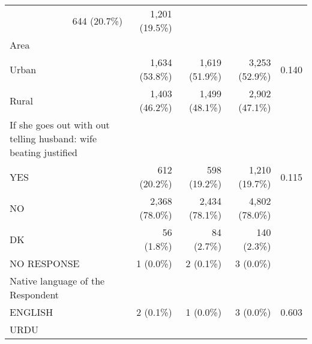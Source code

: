 \documentclass{article}
\begin{document}
\begin{table}[!h]
\begin{tabular}{lllll}
  \multicolumn{1}{r}{644 (20.7\%)} &
  \multicolumn{1}{r}{1,201 (19.5\%)} &
  \multicolumn{1}{r}{} \\
\multicolumn{1}{l}{Area} &
  \multicolumn{1}{r}{} &
  \multicolumn{1}{r}{} &
  \multicolumn{1}{r}{} &
  \multicolumn{1}{r}{} \\
\multicolumn{1}{l}{\hspace{1em}Urban} &
  \multicolumn{1}{r}{1,634 (53.8\%)} &
  \multicolumn{1}{r}{1,619 (51.9\%)} &
  \multicolumn{1}{r}{3,253 (52.9\%)} &
  \multicolumn{1}{r}{0.140} \\
\multicolumn{1}{l}{\hspace{1em}Rural} &
  \multicolumn{1}{r}{1,403 (46.2\%)} &
  \multicolumn{1}{r}{1,499 (48.1\%)} &
  \multicolumn{1}{r}{2,902 (47.1\%)} &
  \multicolumn{1}{r}{} \\
\multicolumn{1}{l}{If she goes out with out telling husband: wife beating justified} &
  \multicolumn{1}{r}{} &
  \multicolumn{1}{r}{} &
  \multicolumn{1}{r}{} &
  \multicolumn{1}{r}{} \\
\multicolumn{1}{l}{\hspace{1em}YES} &
  \multicolumn{1}{r}{612 (20.2\%)} &
  \multicolumn{1}{r}{598 (19.2\%)} &
  \multicolumn{1}{r}{1,210 (19.7\%)} &
  \multicolumn{1}{r}{0.115} \\
\multicolumn{1}{l}{\hspace{1em}NO} &
  \multicolumn{1}{r}{2,368 (78.0\%)} &
  \multicolumn{1}{r}{2,434 (78.1\%)} &
  \multicolumn{1}{r}{4,802 (78.0\%)} &
  \multicolumn{1}{r}{} \\
\multicolumn{1}{l}{\hspace{1em}DK} &
  \multicolumn{1}{r}{56 (1.8\%)} &
  \multicolumn{1}{r}{84 (2.7\%)} &
  \multicolumn{1}{r}{140 (2.3\%)} &
  \multicolumn{1}{r}{} \\
\multicolumn{1}{l}{\hspace{1em}NO RESPONSE} &
  \multicolumn{1}{r}{1 (0.0\%)} &
  \multicolumn{1}{r}{2 (0.1\%)} &
  \multicolumn{1}{r}{3 (0.0\%)} &
  \multicolumn{1}{r}{} \\
\multicolumn{1}{l}{Native language of the Respondent} &
  \multicolumn{1}{r}{} &
  \multicolumn{1}{r}{} &
  \multicolumn{1}{r}{} &
  \multicolumn{1}{r}{} \\
\multicolumn{1}{l}{\hspace{1em}ENGLISH} &
  \multicolumn{1}{r}{2 (0.1\%)} &
  \multicolumn{1}{r}{1 (0.0\%)} &
  \multicolumn{1}{r}{3 (0.0\%)} &
  \multicolumn{1}{r}{0.603} \\
\multicolumn{1}{l}{\hspace{1em}URDU} &

\end{tabular}
\end{table}
\end{document}
